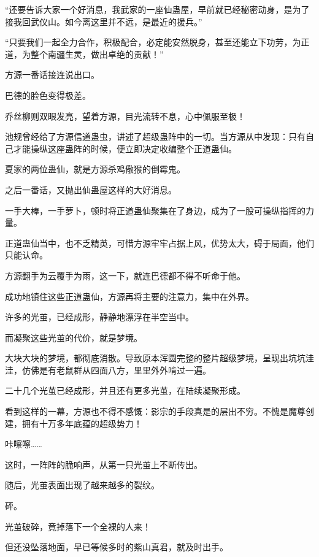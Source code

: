 
\begin{this_body}



“还要告诉大家一个好消息，我武家的一座仙蛊屋，早前就已经秘密动身，是为了接我回武仪山。如今离这里并不远，是最近的援兵。”

“只要我们一起全力合作，积极配合，必定能安然脱身，甚至还能立下功劳，为正道，为整个南疆生灵，做出卓绝的贡献！”

方源一番话接连说出口。

巴德的脸色变得极差。

乔丝柳则双眼发亮，望着方源，目光流转不息，心中佩服至极！

池规曾经给了方源信道蛊虫，讲述了超级蛊阵中的一切。当方源从中发现：只有自己才能操纵这座蛊阵的时候，便立即决定收编整个正道蛊仙。

夏家的两位蛊仙，就是方源杀鸡儆猴的倒霉鬼。

之后一番话，又抛出仙蛊屋这样的大好消息。

一手大棒，一手萝卜，顿时将正道蛊仙聚集在了身边，成为了一股可操纵指挥的力量。

正道蛊仙当中，也不乏精英，可惜方源牢牢占据上风，优势太大，碍于局面，他们只能认命。

方源翻手为云覆手为雨，这一下，就连巴德都不得不听命于他。

成功地镇住这些正道蛊仙，方源再将主要的注意力，集中在外界。

许多的光茧，已经成形，静静地漂浮在半空当中。

而凝聚这些光茧的代价，就是梦境。

大块大块的梦境，都彻底消散。导致原本浑圆完整的整片超级梦境，呈现出坑坑洼洼，仿佛是有老鼠群从四面八方，里里外外啃过一遍。

二十几个光茧已经成形，并且还有更多光茧，在陆续凝聚形成。

看到这样的一幕，方源也不得不感慨：影宗的手段真是的层出不穷。不愧是魔尊创建，拥有十万多年底蕴的超级势力！

咔嚓嚓……

这时，一阵阵的脆响声，从第一只光茧上不断传出。

随后，光茧表面出现了越来越多的裂纹。

砰。

光茧破碎，竟掉落下一个全裸的人来！

但还没坠落地面，早已等候多时的紫山真君，就及时出手。


\end{this_body}
